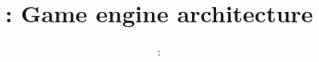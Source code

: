 \usepackage{../../beamerthemeFalmouthGamesAcademy}
\usepackage{multimedia}
\graphicspath{ {../../} }


\usepackage[normalem]{ulem}
\usepackage{wasysym}

\usepackage{pdfpages}

\usetikzlibrary{arrows,automata}




\title{\sessionnumber: Game engine architecture}
\subtitle{\modulecode: \moduletitle}

\frame{\titlepage} 







